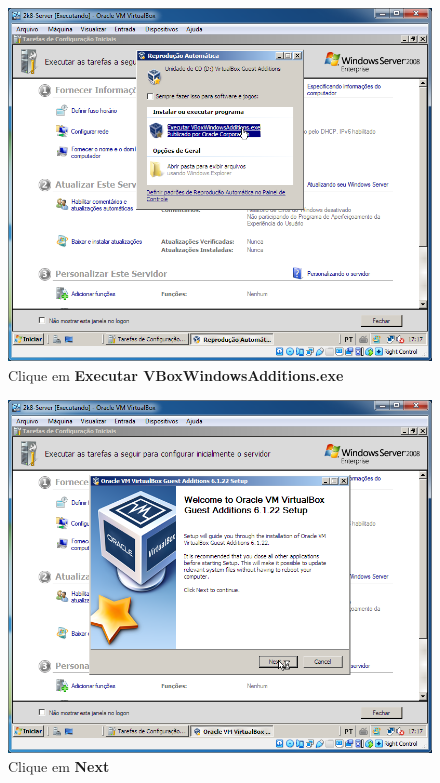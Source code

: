 \documentclass[10pt]{article}
\begin{document}
\begin{figure}[H]
    \centering
    \caption{Clique em \textbf{Executar VBoxWindowsAdditions.exe}}
    \label{fig:3131}
    \includegraphics[width=\linewidth]{images/ativacao_das_maquinas_virtuais/configuracao_inicial_das_maquinas_virtuais/031.png}
\end{figure}
\begin{figure}[H]
    \centering
    \caption{Clique em \textbf{Next}}
    \label{fig:3132}
    \includegraphics[width=\linewidth]{images/ativacao_das_maquinas_virtuais/configuracao_inicial_das_maquinas_virtuais/032.png}
\end{figure}
\end{document}

